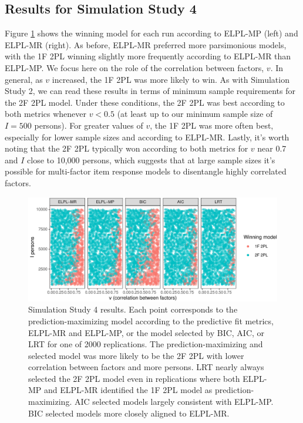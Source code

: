 \documentclass[
  english,
  man,floatsintext]{apa7}
\begin{document}
\hypertarget{results-for-simulation-study-4}{%
\subsection{Results for Simulation Study 4}\label{results-for-simulation-study-4}}

Figure \ref{fig:results6a} shows the winning model for each run according to ELPL-MP (left) and ELPL-MR (right). As before, ELPL-MR preferred more parsimonious models, with the 1F 2PL winning slightly more frequently according to ELPL-MR than ELPL-MP. We focus here on the role of the correlation between factors, \(v\). In general, as \(v\) increased, the 1F 2PL was more likely to win. As with Simulation Study 2, we can read these results in terms of minimum sample requirements for the 2F 2PL model. Under these conditions, the 2F 2PL was best according to both metrics whenever \(v < 0.5\) (at least up to our minimum sample size of \(I = 500\) persons). For greater values of \(v\), the 1F 2PL was more often best, especially for lower sample sizes and according to ELPL-MR. Lastly, it's worth noting that the 2F 2PL typically won according to both metrics for \(v\) near 0.7 and \(I\) close to 10,000 persons, which suggests that at large sample sizes it's possible for multi-factor item response models to disentangle highly correlated factors.

\begin{figure}

{\centering \includegraphics[width=2100px]{irt-predictive-fit-apa_files/figure-latex/results6a-1}

}

\caption{Simulation Study 4 results. Each point corresponds to the prediction-maximizing model according to the predictive fit metrics, ELPL-MR and ELPL-MP, or the model selected by BIC, AIC, or LRT for one of 2000 replications. The prediction-maximizing and selected model was more likely to be the 2F 2PL with lower correlation between factors and more persons. LRT nearly always selected the 2F 2PL model even in replications where both ELPL-MP and ELPL-MR identified the 1F 2PL model as prediction-maximizing. AIC selected models largely consistent with ELPL-MP. BIC selected models more closely aligned to ELPL-MR.}\label{fig:results6a}
\end{figure}
\end{document}
